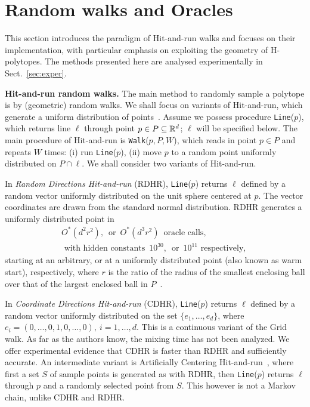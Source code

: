\documentclass[11pt,a4paper]{article}
\def\Line{{\tt Line}}
\def\Walk{{\tt Walk}}
\begin{document}
\section{Random walks and Oracles} \label{sec:OraclSampl}
This section introduces the paradigm of Hit-and-run walks and focuses on
their implementation, with particular emphasis on exploiting the geometry
of H-polytopes. The methods presented here are analysed experimentally in Sect.~\ref{sec:exper}.

\textbf{Hit-and-run random walks.} 
The main method to randomly sample a polytope is
by (geometric) random walks.
We shall focus on variants of Hit-and-run, which generate a uniform
distribution of points~\cite{smith1984montecarlo}. Assume we possess procedure \Line($p$), which returns line $\ell$ through
point $p\in P\subseteq{\mathbb R}^d$; $\ell$ will be specified below.
The main procedure of Hit-and-run is \Walk($p,P,W$), which reads in point
$p\in P$ and repeats $W$ times:
(i) run \Line($p$), 
(ii) move $p$ to a random point uniformly distributed on $P\cap \ell$.
We shall consider two variants of Hit-and-run.

In {\it Random Directions Hit-and-run} (RDHR),
\Line($p$) returns $\ell$ defined by a random vector
uniformly distributed on the unit sphere centered at $p$.
The vector coordinates are drawn from the standard normal distribution.
RDHR generates a uniformly distributed point in  
\begin{eqnarray}\label{Ewalklength}
O^*(d^2 r^2),\, \mbox{ or }\, O^*(d^3 r^2)\, \mbox{ oracle calls},\\ 
\mbox{ with hidden constants }\, 10^{30},\, \mbox{ or }\, 10^{11} \mbox{ respectively, }\nonumber
\end{eqnarray}
starting at an arbitrary, or at
a uniformly distributed point (also known as warm start), respectively, 
where $r$ is the ratio of the radius of the smallest enclosing 
ball over that of the largest enclosed ball in $P$~\cite{LovaszV06corner}.

In {\it Coordinate Directions Hit-and-run} (CDHR),
\Line($p$) returns $\ell$ defined by a random vector
uniformly distributed on the set $\{e_1,\dots,e_d\}$,
where $e_i=(0,\dots,0,1,0,\dots,0),\ i=1,\dots,d.$
This is a continuous variant of the Grid walk.  
As far as the authors know, the mixing time has not been analyzed.
We offer experimental evidence that CDHR is faster than RDHR and
sufficiently accurate.
An intermediate variant is Artificially Centering
Hit-and-run~\cite{Smith_AHNR98}, where first a set $S$ of sample points
is generated as with RDHR, then \Line($p$) returns $\ell$ through $p$ and a randomly
selected point from $S$.
This however is not a Markov chain, unlike CDHR and RDHR.
\end{document}
